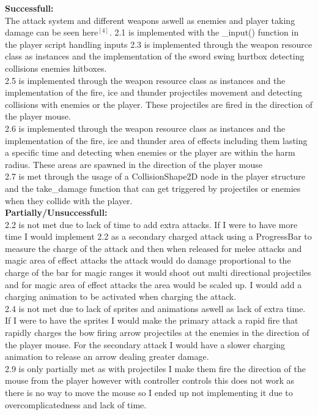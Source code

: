 \documentclass{article}
\begin{document}
        \textbf{Successfull:}\\
        The attack system and different weapons aswell as enemies and player taking damage can be seen here$^{[4]}$.
        2.1 is implemented with the \_input() function in the player script handling inputs
        2.3 is implemented through the weapon resource class as instances and the implementation of the sword swing hurtbox detecting collisions enemies hitboxes.\\
        2.5 is implemented through the weapon resource class as instances and the implementation of the fire, ice and thunder projectiles movement and detecting collisions with enemies or the player. These projectiles are fired in the direction of the player mouse.\\
        2.6 is implemented through the weapon resource class as instances and the implementation of the fire, ice and thunder area of effects including them lasting a specific time and detecting when enemies or the player are within the harm radius. These areas are spawned in the direction of the player mouse\\
        2.7 is met through the usage of a CollisionShape2D node in the player structure and the take\_damage function that can get triggered by projectiles or enemies when they collide with the player.\\
        \textbf{Partially/Unsuccessfull:}\\
        2.2 is not met due to lack of time to add extra attacks.
        If I were to have more time I would implement 2.2 as a secondary charged attack using a ProgressBar to measure the charge of the attack and then when released for melee attacks and magic area of effect attacks the attack would do damage proportional to the charge of the bar for magic ranges it would shoot out multi directional projectiles and for magic area of effect attacks the area would be scaled up. I would add a charging animation to be activated when charging the attack.\\
        2.4 is not met due to lack of sprites and animations aswell as lack of extra time.\\
        If I were to have the sprites I would make the primary attack a rapid fire that rapidly charges the bow firing arrow projectiles at the enemies in the direction of the player mouse. For the secondary attack I would have a slower charging animation to release an arrow dealing greater damage.\\
        2.9 is only partially met as with projectiles I make them fire the direction of the mouse from the player however with controller controls this does not work as there is no way to move the mouse so I ended up not implementing it due to overcomplicatedness and lack of time.\\
\end{document}
